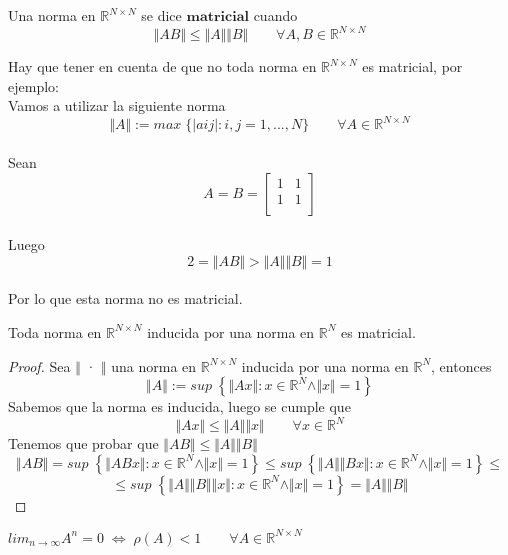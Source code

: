 \begin{ndef}
Una norma en $\mathbb{R}^{N \times N}$ se dice $\textbf{matricial}$ cuando
\[ \Vert AB \Vert \leq \Vert A \Vert \Vert B \Vert \qquad \forall A,B \in \mathbb{R}^{N \times N} \]
\end{ndef}

Hay que tener en cuenta de que no toda norma en $\mathbb{R}^{N \times N}$ es matricial, por ejemplo:\\
Vamos a utilizar la siguiente norma\\
$$\Vert A \Vert := max \; \lbrace \vert a{ij} \vert : i, j = 1,...,N \rbrace \qquad \forall A \in \mathbb{R}^{N \times N}$$ \\
Sean $$A = B = \begin{bmatrix}
1 & 1 \\
1 & 1 \\
\end{bmatrix}$$\\
Luego $$2 = \Vert AB \Vert > \Vert A \Vert \Vert B \Vert = 1$$\\
Por lo que esta norma no es matricial.\\

\begin{nprop}
Toda norma en $\mathbb{R}^{N \times N}$ inducida por una norma en $\mathbb{R}^N$ es matricial.
\end{nprop}

\begin{proof}
Sea $\Vert$ · $\Vert$ una norma en $\mathbb{R}^{N \times N}$ inducida por una norma en $\mathbb{R}^N$, entonces
\[ \Vert A \Vert := sup \; \left\lbrace \Vert Ax \Vert : x \in \mathbb{R}^N \wedge \Vert x \Vert = 1 \right\rbrace \]
Sabemos que la norma es inducida, luego se cumple que
\[ \Vert Ax \Vert \leq \Vert A \Vert \Vert x \Vert \qquad \forall x \in \mathbb{R}^N \]
Tenemos que probar que $\Vert AB \Vert \leq \Vert A \Vert \Vert B \Vert$\\
\[ \Vert AB \Vert = sup \; \left\lbrace \Vert ABx \Vert : x \in \mathbb{R}^N \wedge \Vert x \Vert = 1 \right\rbrace \leq sup \; \left\lbrace \Vert A \Vert \Vert Bx \Vert : x \in \mathbb{R}^N \wedge \Vert x \Vert = 1 \right\rbrace \leq \] \[ \leq sup \; \left\lbrace \Vert A \Vert \Vert B \Vert \Vert x \Vert : x \in \mathbb{R}^N \wedge \Vert x \Vert = 1 \right\rbrace = \Vert A \Vert \Vert B \Vert \]
\end{proof}

\begin{nth}
$lim_{n \rightarrow \infty} A^n = 0 \; \Leftrightarrow \; \rho (A) < 1 \qquad \forall A \in \mathbb{R}^{N \times N} $
\end{nth}


